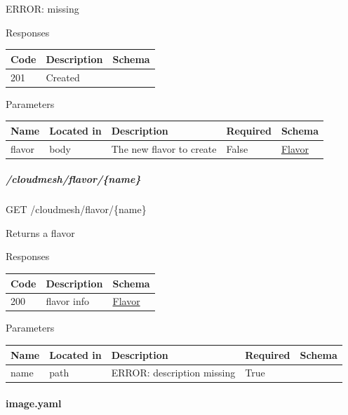 \documentclass[9pt,]{article}
\let\oldparagraph\paragraph
\renewcommand{\paragraph}[1]{\oldparagraph{#1}\mbox{}}
\let\oldsubparagraph\subparagraph
\renewcommand{\subparagraph}[1]{\oldsubparagraph{#1}\mbox{}}
\begin{document}
ERROR: missing

Responses

\begin{longtable}[]{@{}lll@{}}
\toprule
Code & Description & Schema\tabularnewline
\midrule
\endhead
201 & Created &\tabularnewline
\bottomrule
\end{longtable}

Parameters

\begin{longtable}[]{@{}lllll@{}}
\toprule
Name & Located in & Description & Required & Schema\tabularnewline
\midrule
\endhead
flavor & body & The new flavor to create & False &
\protect\hyperlink{flavor}{Flavor}\tabularnewline
\bottomrule
\end{longtable}

\hypertarget{cloudmeshflavorname}{%
\subparagraph{/cloudmesh/flavor/\{name\}}\label{cloudmeshflavorname}}

GET /cloudmesh/flavor/\{name\}

Returns a flavor

Responses

\begin{longtable}[]{@{}lll@{}}
\toprule
Code & Description & Schema\tabularnewline
\midrule
\endhead
200 & flavor info & \protect\hyperlink{flavor}{Flavor}\tabularnewline
\bottomrule
\end{longtable}

Parameters

\begin{longtable}[]{@{}lllll@{}}
\toprule
Name & Located in & Description & Required & Schema\tabularnewline
\midrule
\endhead
name & path & ERROR: description missing & True &\tabularnewline
\bottomrule
\end{longtable}

\hypertarget{image.yaml-1}{%
\paragraph{image.yaml}\label{image.yaml-1}}
\end{document}
